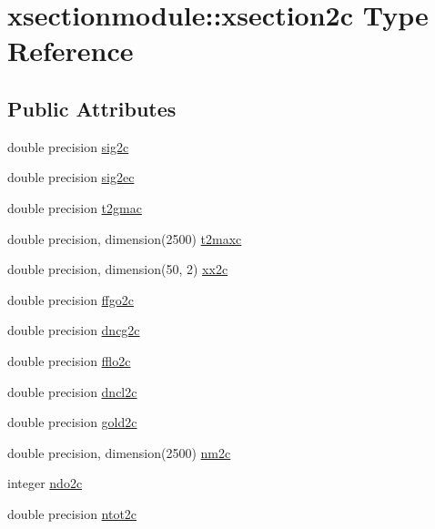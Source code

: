 \hypertarget{structxsectionmodule_1_1xsection2c}{}\section{xsectionmodule\+:\+:xsection2c Type Reference}
\label{structxsectionmodule_1_1xsection2c}
\subsection*{Public Attributes}
\begin{DoxyCompactItemize}
\item 
double precision \hyperlink{structxsectionmodule_1_1xsection2c_adc2a7f92a957df5e99626372883e929e}{sig2c}
\item 
double precision \hyperlink{structxsectionmodule_1_1xsection2c_a3caa4bb910e66d2cbc41ef0e53832579}{sig2ec}
\item 
double precision \hyperlink{structxsectionmodule_1_1xsection2c_a2af05ab660004e80a66548bc81943687}{t2gmac}
\item 
double precision, dimension(2500) \hyperlink{structxsectionmodule_1_1xsection2c_a018273d6282bd59362ba70923de20c15}{t2maxc}
\item 
double precision, dimension(50, 2) \hyperlink{structxsectionmodule_1_1xsection2c_aeaa704ffd910c6478c4a3a0f38d76231}{xx2c}
\item 
double precision \hyperlink{structxsectionmodule_1_1xsection2c_ac35590659b3164c17a5ba9468630ea8d}{ffgo2c}
\item 
double precision \hyperlink{structxsectionmodule_1_1xsection2c_a45d6b3b52f169206eb5bd16ada9fd034}{dncg2c}
\item 
double precision \hyperlink{structxsectionmodule_1_1xsection2c_a4226e4bcbbe2f3caa5d5cb456961c841}{fflo2c}
\item 
double precision \hyperlink{structxsectionmodule_1_1xsection2c_a8d8a5d3e11cc022a84233d44bad2fbb9}{dncl2c}
\item 
double precision \hyperlink{structxsectionmodule_1_1xsection2c_aa4c4ec75e629ba399bc8f499b523c3d0}{gold2c}
\item 
double precision, dimension(2500) \hyperlink{structxsectionmodule_1_1xsection2c_a8941ff6144b43aa5ca60f4c351cb47ae}{nm2c}
\item 
integer \hyperlink{structxsectionmodule_1_1xsection2c_a54a8df9bbc892e1ff0b6d9b0fb44731d}{ndo2c}
\item 
double precision \hyperlink{structxsectionmodule_1_1xsection2c_a390336f034bfa2ca0bd0ff9a7f3b8f1e}{ntot2c}

\end{DoxyCompactItemize}
